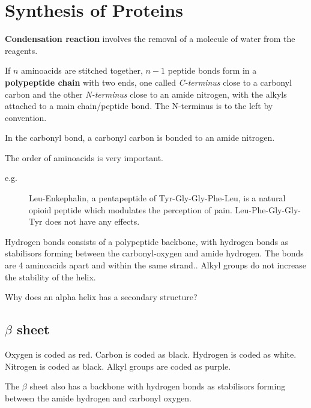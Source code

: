 \documentclass[11pt]{scrartcl}
\begin{document}
\section{Synthesis of Proteins}

\begin{definition}
  \textbf{Condensation reaction} involves the removal of a molecule of
  water from the reagents.
\end{definition}

If $n$ aminoacids are stitched together, $n-1$ peptide bonds form in a
\textbf{polypeptide chain} with two ends, one called
\textit{C-terminus} close to a carbonyl carbon and the other
\textit{N-terminus} close to an amide nitrogen, with the alkyls
attached to a main chain/peptide bond. The N-terminus is to the left
by convention.

In the carbonyl bond, a carbonyl carbon is bonded to an amide
nitrogen.

The order of aminoacids is very important.

\begin{description}

\item[e.g.] Leu-Enkephalin, a pentapeptide of Tyr-Gly-Gly-Phe-Leu, is
  a natural opioid peptide which modulates the perception of pain.
  Leu-Phe-Gly-Gly-Tyr does not have any effects.

\end{description}

Hydrogen bonds consists of a polypeptide backbone, with hydrogen bonds
as stabilisors forming between the carbonyl-oxygen and amide
hydrogen. The bonds are 4 aminoacids apart and within the same
strand.. Alkyl groups do not increase the stability of the helix.

\begin{ques*}
Why does an alpha helix has a secondary structure?
\end{ques*}

\subsection{$\beta$ sheet}
\begin{remark}
  Oxygen is coded as red.
  Carbon is coded as black.
  Hydrogen is coded as white.
  Nitrogen is coded as black.
  Alkyl groups are coded as purple.
\end{remark}

The $\beta$ sheet also has a backbone with hydrogen bonds as
stabilisors forming between the amide hydrogen and carbonyl oxygen.
\end{document}
